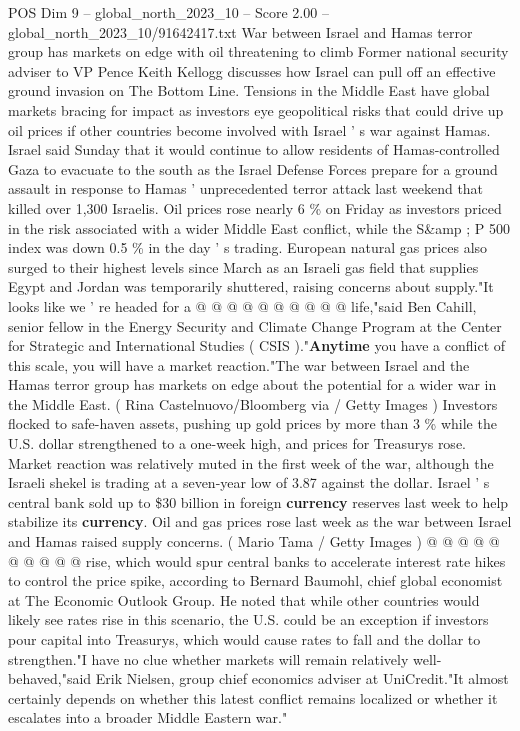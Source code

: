\begin{textsample}{POS Dim 9 – global\_north\_2023\_10 – Score 2.00 – global\_north\_2023\_10/91642417.txt}  \label{ex:f9_pos_410}
War between Israel and Hamas terror group has markets on edge with oil threatening to climb Former national security adviser to VP Pence Keith Kellogg discusses how Israel can pull off an effective ground invasion on The Bottom Line.
Tensions in the Middle East have global markets bracing for impact as investors eye geopolitical risks that could drive up oil prices if other countries become involved with Israel ' s war against Hamas.
Israel said Sunday that it would continue to allow residents of Hamas-controlled Gaza to evacuate to the south as the Israel Defense Forces prepare for a ground assault in response to Hamas ' unprecedented terror attack last weekend that killed over 1,300 Israelis.
Oil prices rose nearly 6 \% on Friday as investors priced in the risk associated with a wider Middle East conflict, while the S\&amp ; P 500 index was down 0.5 \% in the day ' s trading.
European natural gas prices also surged to their highest levels since March as an Israeli gas field that supplies Egypt and Jordan was temporarily shuttered, raising concerns about supply."It looks like we ' re headed for a @ @ @ @ @ @ @ @ @ @ life,"said Ben Cahill, senior fellow in the Energy Security and Climate Change Program at the Center for Strategic and International Studies ( CSIS )."\textbf{Anytime} you have a conflict of this scale, you will have a market reaction."The war between Israel and the Hamas terror group has markets on edge about the potential for a wider war in the Middle East. ( Rina Castelnuovo/Bloomberg via / Getty Images ) Investors flocked to safe-haven assets, pushing up gold prices by more than 3 \% while the U.S. dollar strengthened to a one-week high, and prices for Treasurys rose.
Market reaction was relatively muted in the first week of the war, although the Israeli shekel is trading at a seven-year low of 3.87 against the dollar.
Israel ' s central bank sold up to \$30 billion in foreign \textbf{currency} reserves last week to help stabilize its \textbf{currency}.
Oil and gas prices rose last week as the war between Israel and Hamas raised supply concerns. ( Mario Tama / Getty Images ) @ @ @ @ @ @ @ @ @ @ rise, which would spur central banks to accelerate interest rate hikes to control the price spike, according to Bernard Baumohl, chief global economist at The Economic Outlook Group.
He noted that while other countries would likely see rates rise in this scenario, the U.S. could be an exception if investors pour capital into Treasurys, which would cause rates to fall and the dollar to strengthen."I have no clue whether markets will remain relatively well-behaved,"said Erik Nielsen, group chief economics adviser at UniCredit."It almost certainly depends on whether this latest conflict remains localized or whether it escalates into a broader Middle Eastern war."

\end{textsample}
